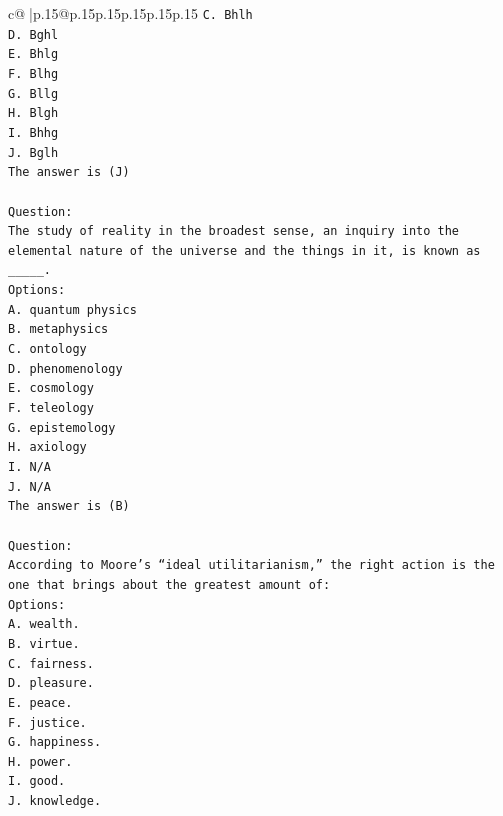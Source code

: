 \documentclass{article}
\begin{document}
{\begin{supertabular}{c@{$\;$}|p{.15\linewidth}@{}p{.15\linewidth}p{.15\linewidth}p{.15\linewidth}p{.15\linewidth}p{.15\linewidth}}
{{{\texttt{C. Bhlh} \\
\texttt{D. Bghl} \\
\texttt{E. Bhlg} \\
\texttt{F. Blhg} \\
\texttt{G. Bllg} \\
\texttt{H. Blgh} \\
\texttt{I. Bhhg} \\
\texttt{J. Bglh} \\
\texttt{The answer is (J)} \\
\\ 
\texttt{Question:} \\
\texttt{The study of reality in the broadest sense, an inquiry into the elemental nature of the universe and the things in it, is known as \_\_\_\_\_.} \\
\texttt{Options:} \\
\texttt{A. quantum physics} \\
\texttt{B. metaphysics} \\
\texttt{C. ontology} \\
\texttt{D. phenomenology} \\
\texttt{E. cosmology} \\
\texttt{F. teleology} \\
\texttt{G. epistemology} \\
\texttt{H. axiology} \\
\texttt{I. N/A} \\
\texttt{J. N/A} \\
\texttt{The answer is (B)} \\
\\ 
\texttt{Question:} \\
\texttt{According to Moore’s “ideal utilitarianism,” the right action is the one that brings about the greatest amount of:} \\
\texttt{Options:} \\
\texttt{A. wealth.} \\
\texttt{B. virtue.} \\
\texttt{C. fairness.} \\
\texttt{D. pleasure.} \\
\texttt{E. peace.} \\
\texttt{F. justice.} \\
\texttt{G. happiness.} \\
\texttt{H. power.} \\
\texttt{I. good.} \\
\texttt{J. knowledge.} \\
}}}
\end{supertabular}}
\end{document}
